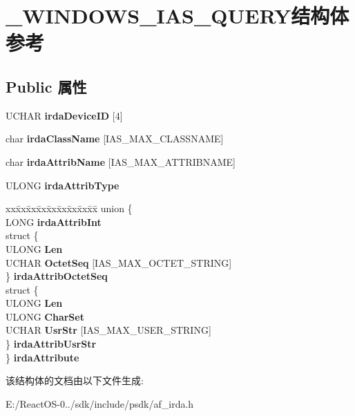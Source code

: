 \hypertarget{struct___w_i_n_d_o_w_s___i_a_s___q_u_e_r_y}{}\section{\+\_\+\+W\+I\+N\+D\+O\+W\+S\+\_\+\+I\+A\+S\+\_\+\+Q\+U\+E\+R\+Y结构体 参考}
\label{struct___w_i_n_d_o_w_s___i_a_s___q_u_e_r_y}
\subsection*{Public 属性}
\begin{DoxyCompactItemize}
\item 
\mbox{\label{struct___w_i_n_d_o_w_s___i_a_s___q_u_e_r_y_a29400d81df35676ff9d8cc6684fb00bd}} 
U\+C\+H\+AR {\bfseries irda\+Device\+ID} \mbox{[}4\mbox{]}
\item 
\mbox{\label{struct___w_i_n_d_o_w_s___i_a_s___q_u_e_r_y_a757e70574c68ef3d1a04414fcfb57603}} 
char {\bfseries irda\+Class\+Name} \mbox{[}I\+A\+S\+\_\+\+M\+A\+X\+\_\+\+C\+L\+A\+S\+S\+N\+A\+ME\mbox{]}
\item 
\mbox{\label{struct___w_i_n_d_o_w_s___i_a_s___q_u_e_r_y_a2bb65d5f30a1962253d44a46147139ec}} 
char {\bfseries irda\+Attrib\+Name} \mbox{[}I\+A\+S\+\_\+\+M\+A\+X\+\_\+\+A\+T\+T\+R\+I\+B\+N\+A\+ME\mbox{]}
\item 
\mbox{\label{struct___w_i_n_d_o_w_s___i_a_s___q_u_e_r_y_a40512d1eb087519c093303884290df02}} 
U\+L\+O\+NG {\bfseries irda\+Attrib\+Type}
\item 
\mbox{\label{struct___w_i_n_d_o_w_s___i_a_s___q_u_e_r_y_a8c3463b85f973984b3ba22426ff75abb}} 
\begin{tabbing}
xx\=xx\=xx\=xx\=xx\=xx\=xx\=xx\=xx\=\kill
union \{\\
\>LONG {\bfseries irdaAttribInt}\\
\>struct \{\\
\>\>ULONG {\bfseries Len}\\
\>\>UCHAR {\bfseries OctetSeq} \mbox{[}IAS\_MAX\_OCTET\_STRING\mbox{]}\\
\>\} {\bfseries irdaAttribOctetSeq}\\
\>struct \{\\
\>\>ULONG {\bfseries Len}\\
\>\>ULONG {\bfseries CharSet}\\
\>\>UCHAR {\bfseries UsrStr} \mbox{[}IAS\_MAX\_USER\_STRING\mbox{]}\\
\>\} {\bfseries irdaAttribUsrStr}\\
\} {\bfseries irdaAttribute}\\

\end{tabbing}\end{DoxyCompactItemize}


该结构体的文档由以下文件生成\+:\begin{DoxyCompactItemize}
\item 
E\+:/\+React\+O\+S-\/0../sdk/include/psdk/af\+\_\+irda.\+h\end{DoxyCompactItemize}
